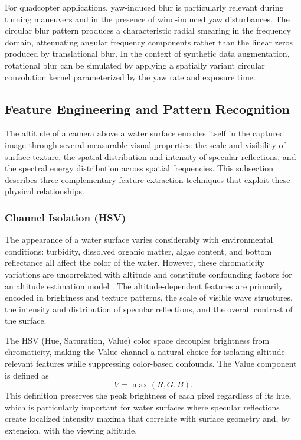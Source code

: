     For quadcopter applications, yaw-induced blur is particularly relevant during turning maneuvers and in the presence of wind-induced yaw disturbances. The circular blur pattern produces a characteristic radial smearing in the frequency domain, attenuating angular frequency components rather than the linear zeros produced by translational blur. In the context of synthetic data augmentation, rotational blur can be simulated by applying a spatially variant circular convolution kernel parameterized by the yaw rate and exposure time.

\subsection{Feature Engineering and Pattern Recognition}

The altitude of a camera above a water surface encodes itself in the captured image through several measurable visual properties: the scale and visibility of surface texture, the spatial distribution and intensity of specular reflections, and the spectral energy distribution across spatial frequencies. This subsection describes three complementary feature extraction techniques that exploit these physical relationships.

    \subsubsection{Channel Isolation (HSV)}

    The appearance of a water surface varies considerably with environmental conditions: turbidity, dissolved organic matter, algae content, and bottom reflectance all affect the color of the water. However, these chromaticity variations are uncorrelated with altitude and constitute confounding factors for an altitude estimation model \cite{ColorTurb, Pekel2016}. The altitude-dependent features are primarily encoded in brightness and texture patterns, the scale of visible wave structures, the intensity and distribution of specular reflections, and the overall contrast of the surface.

    The HSV (Hue, Saturation, Value) color space decouples brightness from chromaticity, making the Value channel a natural choice for isolating altitude-relevant features while suppressing color-based confounds. The Value component is defined as
    \begin{equation}
        V = \max(R, G, B) .
        \label{eq:hsv_value}
    \end{equation}
    This definition preserves the peak brightness of each pixel regardless of its hue, which is particularly important for water surfaces where specular reflections create localized intensity maxima that correlate with surface geometry and, by extension, with the viewing altitude.


